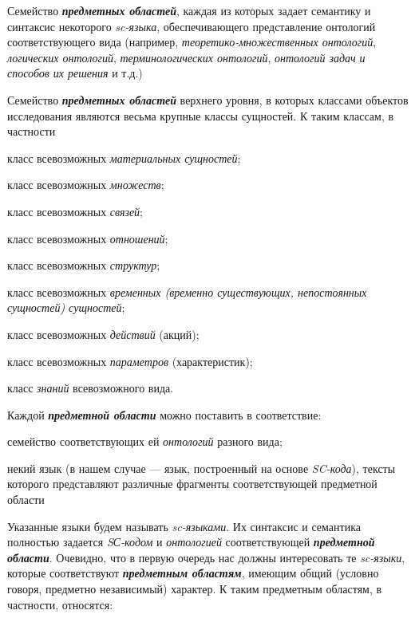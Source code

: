 \begin{SCn}
\begin{scnsubstruct}
\begin{scnsubstruct}
{\begin{scnitemize}
                    \item Семейство \textbf{\textit{предметных областей}}, каждая из которых задает семантику и синтаксис некоторого \textit{sc-языка}, обеспечивающего представление онтологий соответствующего вида (например, \textit{теоретико-множественных онтологий}, \textit{логических онтологий}, \textit{терминологических онтологий}, \textit{онтологий задач и способов их решения} и т.д.)
                    \item Семейство \textbf{\textit{предметных областей}} верхнего уровня, в которых классами объектов исследования являются весьма крупные классы сущностей. К таким классам, в частности
                    \begin{scnitemizeii}
                        \item класс всевозможных \textit{материальных сущностей};
                        \item класс всевозможных \textit{множеств};
                        \item класс всевозможных \textit{связей};
                        \item класс всевозможных \textit{отношений};
                        \item класс всевозможных \textit{структур};
                        \item класс всевозможных \textit{временных (временно существующих, непостоянных сущностей) сущностей};
                        \item класс всевозможных \textit{действий} (акций);
                        \item класс всевозможных \textit{параметров} (характеристик);
                        \item класс \textit{знаний} всевозможного вида.
                    \end{scnitemizeii}
                \end{scnitemize}
                Каждой \textbf{\textit{предметной области}} можно поставить в соответствие:
                \begin{scnitemize}
                    \item семейство соответствующих ей \textit{онтологий} разного вида;
                    \item некий язык (в нашем случае --- язык, построенный на основе \textit{SC-кода}), тексты которого представляют различные фрагменты соответствующей предметной области
                \end{scnitemize}
                Указанные языки будем называть \textit{sc-языками}. Их синтаксис и семантика полностью задается \textit{SС-кодом} и \textit{онтологией} соответствующей \textbf{\textit{предметной области}}. Очевидно, что в первую очередь нас должны интересовать те \textit{sc-языки}, которые соответствуют \textbf{\textit{предметным областям}}, имеющим общий (условно говоря, предметно независимый) характер. К таким предметным областям, в частности, относятся:
}
\end{scnsubstruct}
\end{scnsubstruct}
\end{SCn}
